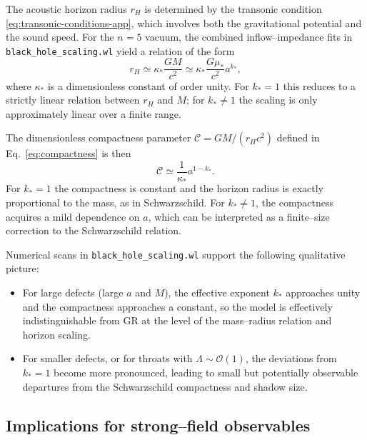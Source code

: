 \documentclass[11pt]{article}
\begin{document}
The acoustic horizon radius \(r_H\) is determined by the transonic condition
\eqref{eq:transonic-conditions-app}, which involves both the gravitational
potential and the sound speed.  For the \(n=5\) vacuum, the combined
inflow--impedance fits in \texttt{black\_hole\_scaling.wl} yield a
relation of the form
\begin{equation}
  r_H
  \simeq \kappa_* \frac{G M}{c^2}
       \simeq \kappa_* \frac{G \mu_*}{c^2} a^{k_*},
  \label{eq:rH-scaling-kstar}
\end{equation}
where \(\kappa_*\) is a dimensionless constant of order unity.  For
\(k_* = 1\) this reduces to a strictly linear relation between \(r_H\) and
\(M\); for \(k_* \neq 1\) the scaling is only approximately linear over a
finite range.

The dimensionless compactness parameter
\(\mathcal{C} = G M/(r_H c^2)\) defined in
Eq.~\eqref{eq:compactness} is then
\begin{equation}
  \mathcal{C}
  \simeq \frac{1}{\kappa_*} a^{1-k_*}.
\end{equation}
For \(k_* = 1\) the compactness is constant and the horizon radius is
exactly proportional to the mass, as in Schwarzschild.  For \(k_* \neq 1\),
the compactness acquires a mild dependence on \(a\), which can be interpreted
as a finite--size correction to the Schwarzschild relation.

Numerical scans in \texttt{black\_hole\_scaling.wl} support the following
qualitative picture:
\begin{itemize}
  \item For large defects (large \(a\) and \(M\)), the effective exponent
        \(k_*\) approaches unity and the compactness approaches a constant,
        so the model is effectively indistinguishable from GR at the level
        of the mass--radius relation and horizon scaling.
  \item For smaller defects, or for throats with \(\Lambda \sim \mathcal{O}(1)\),
        the deviations from \(k_* = 1\) become more pronounced, leading to
        small but potentially observable departures from the Schwarzschild
        compactness and shadow size.
\end{itemize}

\subsection{Implications for strong--field observables}
\label{app:impedance-implications}
\end{document}
